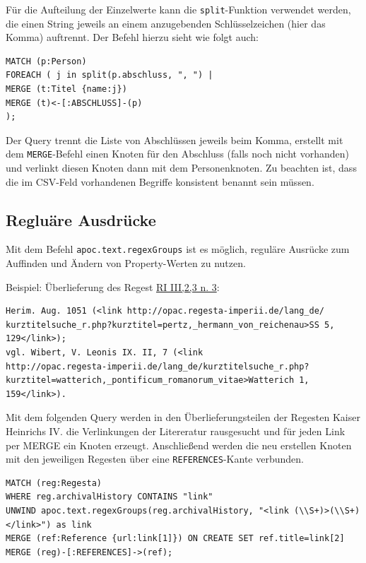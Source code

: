 \documentclass[12pt,ngerman,]{article}
\begin{document}
Für die Aufteilung der Einzelwerte kann die \texttt{split}-Funktion
verwendet werden, die einen String jeweils an einem anzugebenden
Schlüsselzeichen (hier das Komma) auftrennt. Der Befehl hierzu sieht wie
folgt auch:

\begin{verbatim}
MATCH (p:Person)
FOREACH ( j in split(p.abschluss, ", ") |
MERGE (t:Titel {name:j})
MERGE (t)<-[:ABSCHLUSS]-(p)
);
\end{verbatim}

Der Query trennt die Liste von Abschlüssen jeweils beim Komma, erstellt
mit dem \texttt{MERGE}-Befehl einen Knoten für den Abschluss (falls noch
nicht vorhanden) und verlinkt diesen Knoten dann mit dem Personenknoten.
Zu beachten ist, dass die im CSV-Feld vorhandenen Begriffe konsistent
benannt sein müssen.

\subsection{Regluäre Ausdrücke}\label{regluuxe4re-ausdruxfccke}

Mit dem Befehl \texttt{apoc.text.regexGroups} ist es möglich, reguläre
Ausrücke zum Auffinden und Ändern von Property-Werten zu nutzen.

Beispiel: Überlieferung des Regest
\href{http://www.regesta-imperii.de/id/1051-02-02_1_0_3_2_3_3_3}{RI
III,2,3 n. 3}:

\begin{verbatim}
Herim. Aug. 1051 (<link http://opac.regesta-imperii.de/lang_de/
kurztitelsuche_r.php?kurztitel=pertz,_hermann_von_reichenau>SS 5, 129</link>);
vgl. Wibert, V. Leonis IX. II, 7 (<link
http://opac.regesta-imperii.de/lang_de/kurztitelsuche_r.php?
kurztitel=watterich,_pontificum_romanorum_vitae>Watterich 1, 159</link>).
\end{verbatim}

Mit dem folgenden Query werden in den Überlieferungsteilen der Regesten
Kaiser Heinrichs IV. die Verlinkungen der Litereratur rausgesucht und
für jeden Link per MERGE ein Knoten erzeugt. Anschließend werden die neu
erstellen Knoten mit den jeweiligen Regesten über eine
\texttt{REFERENCES}-Kante verbunden.

\begin{verbatim}
MATCH (reg:Regesta)
WHERE reg.archivalHistory CONTAINS "link"
UNWIND apoc.text.regexGroups(reg.archivalHistory, "<link (\\S+)>(\\S+)</link>") as link
MERGE (ref:Reference {url:link[1]}) ON CREATE SET ref.title=link[2]
MERGE (reg)-[:REFERENCES]->(ref);
\end{verbatim}
\end{document}
